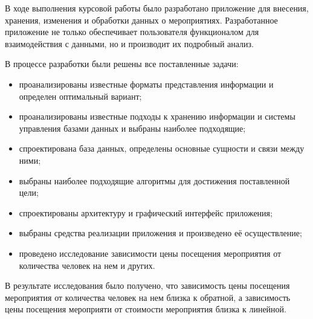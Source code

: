 
В ходе выполнения курсовой работы было разработано приложение для внесения, хранения, изменения и обработки данных о мероприятиях. Разработанное приложение не только обеспечивает пользователя функционалом для взаимодействия с данными, но и производит их подробный анализ.

В процессе разработки были решены все поставленные задачи:
\begin{itemize}[label=--]
	\item проанализированы известные форматы представления информации и определен оптимальный вариант;
	\item проанализированы известные подходы к хранению информации и системы управления базами данных и выбраны наиболее подходящие;
	\item спроектирована база данных, определены основные сущности и связи между ними;
	\item выбраны наиболее подходящие алгоритмы для достижения поставленной цели;
	\item спроектированы архитектуру и графический интерфейс приложения;
	\item выбраны средства реализации приложения и произведено её осуществление;
	\item проведено исследование зависимости цены посещения мероприятия от количества человек на нем и других.
\end{itemize}

В результате исследования было получено, что зависимость цены посещения мероприятия от количества человек на нем близка к обратной, а зависимость цены посещения мероприяти от стоимости мероприятия близка к линейной.